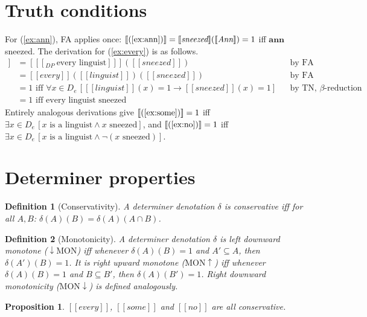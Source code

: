\documentclass{article}
\newtheorem{definition}{Definition}
\newtheorem{proposition}{Proposition}
\newcommand{\sem}[1]{[\![#1]\!]}
\begin{document}
\section{Truth conditions}

For (\ref{ex:ann}), FA applies once:
$\sem{(\ref{ex:ann})} = \sem{\textit{sneezed}}(\sem{\textit{Ann}}) = 1$ iff
$\mathbf{ann}$ sneezed.
The derivation for (\ref{ex:every}) is as follows.
\begin{align*}
  \sem{(\ref{ex:every})}
  &= \sem{[_{DP}\ \text{every linguist}]}(\sem{\textit{sneezed}}) && \text{by FA}\\
  &= \sem{\textit{every}}(\sem{\textit{linguist}})(\sem{\textit{sneezed}}) && \text{by FA}\\
  &= 1 \text{ iff } \forall x \in D_e\,[\sem{\textit{linguist}}(x) = 1 \rightarrow \sem{\textit{sneezed}}(x) = 1] && \text{by TN, $\beta$-reduction}\\
  &= 1 \text{ iff every linguist sneezed}
\end{align*}
Entirely analogous derivations give $\sem{(\ref{ex:some})} = 1$ iff $\exists
x \in D_e\,[x \text{ is a linguist} \wedge x \text{ sneezed}]$, and
$\sem{(\ref{ex:no})} = 1$ iff $\exists x \in D_e\,[x \text{ is a linguist}
\wedge \neg(x \text{ sneezed})]$.

\section{Determiner properties}

\begin{definition}[Conservativity]\label{def:cons}
A determiner denotation $\delta$ is \emph{conservative} iff for all $A, B$:
$\delta(A)(B) = \delta(A)(A \cap B)$.
\end{definition}

\begin{definition}[Monotonicity]\label{def:mon}
A determiner denotation $\delta$ is \emph{left downward monotone}
(${\downarrow}\mathrm{MON}$) iff whenever $\delta(A)(B) = 1$ and
$A' \subseteq A$, then $\delta(A')(B) = 1$. It is \emph{right upward monotone}
($\mathrm{MON}{\uparrow}$) iff whenever $\delta(A)(B) = 1$ and
$B \subseteq B'$, then $\delta(A)(B') = 1$. Right downward monotonicity
($\mathrm{MON}{\downarrow}$) is defined analogously.
\end{definition}

\begin{proposition}\label{prop:cons}
$\sem{\textit{every}}$, $\sem{\textit{some}}$ and $\sem{\textit{no}}$ are
all conservative.
\end{proposition}
\end{document}
